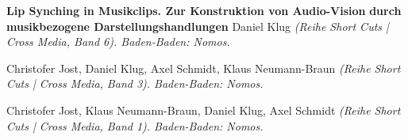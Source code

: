 \documentclass[9pt]{article}
\begin{document}





\noindent\textbf{Lip Synching in Musikclips. Zur Konstruktion von Audio-Vision}\vspace{-0.03in}
\newline\noindent\textbf{durch musikbezogene Darstellungshandlungen}
\newline\noindent Daniel Klug
\newline\noindent\emph{(Reihe Short Cuts | Cross Media, Band 6). Baden-Baden: Nomos.}
\bigskip


\vspace{-0.03in}
\newline{}
\newline\noindent Christofer Jost, Daniel Klug, Axel Schmidt, Klaus Neumann-Braun
\newline\noindent\emph{(Reihe Short Cuts | Cross Media, Band 3). Baden-Baden: Nomos.}
\bigskip

\newline{}
\newline\noindent Christofer Jost, Klaus Neumann-Braun, Daniel Klug, Axel Schmidt
\newline\noindent\emph{(Reihe Short Cuts | Cross Media, Band 1). Baden-Baden: Nomos.}
\bigskip

\end{document}
